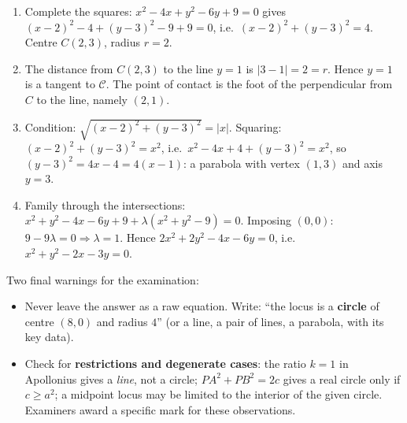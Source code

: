 \documentclass[11pt]{article}
\begin{document}
\begin{corrige}[Exercise 1]
\begin{enumerate}
\item Complete the squares: $x^2-4x + y^2-6y + 9 = 0$ gives $(x-2)^2 - 4 + (y-3)^2 - 9 + 9 = 0$, i.e.\ $(x-2)^2 + (y-3)^2 = 4$. Centre $C(2,3)$, radius $r=2$.
\item The distance from $C(2,3)$ to the line $y = 1$ is $|3-1| = 2 = r$. Hence $y=1$ is a tangent to $\mathcal{C}$. The point of contact is the foot of the perpendicular from $C$ to the line, namely $(2,1)$.
\item Condition: $\sqrt{(x-2)^2+(y-3)^2} = |x|$. Squaring: $(x-2)^2 + (y-3)^2 = x^2$, i.e.\ $x^2 - 4x + 4 + (y-3)^2 = x^2$, so $(y-3)^2 = 4x - 4 = 4(x-1)$: a parabola with vertex $(1,3)$ and axis $y=3$.
\item Family through the intersections: $x^2+y^2-4x-6y+9 + \lambda(x^2+y^2-9) = 0$. Imposing $(0,0)$: $9 - 9\lambda = 0 \Rightarrow \lambda = 1$. Hence $2x^2+2y^2-4x-6y = 0$, i.e.\ $x^2+y^2-2x-3y=0$.
\end{enumerate}
\end{corrige}

\begin{attention}
Two final warnings for the examination:
\begin{itemize}
\item Never leave the answer as a raw equation. Write: ``the locus is a \textbf{circle} of centre $(8,0)$ and radius $4$'' (or a line, a pair of lines, a parabola, with its key data).
\item Check for \textbf{restrictions and degenerate cases}: the ratio $k=1$ in Apollonius gives a \emph{line}, not a circle; $PA^2+PB^2 = 2c$ gives a real circle only if $c \ge a^2$; a midpoint locus may be limited to the interior of the given circle. Examiners award a specific mark for these observations.
\end{itemize}
\end{attention}
\end{document}

